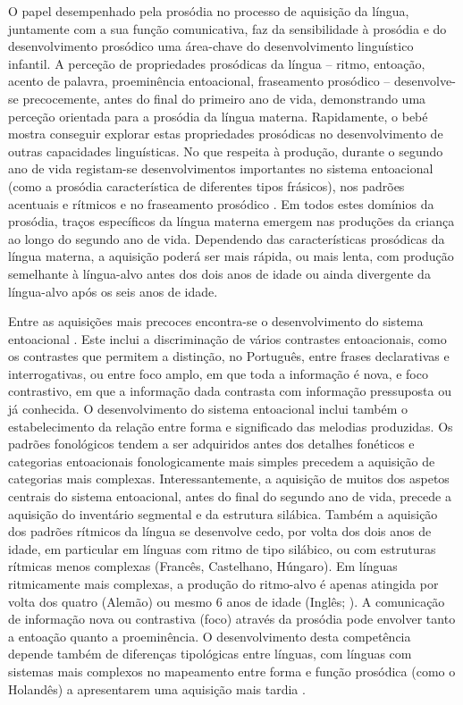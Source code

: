 \documentclass[output=paper,colorlinks,citecolor=brown,booklanguage=portuguese]{langscibook}
\begin{document}
O papel desempenhado pela prosódia no processo de aquisição da língua, juntamente com a sua função comunicativa, faz da sensibilidade à prosódia e do desenvolvimento prosódico uma área-chave do desenvolvimento linguístico infantil. A perceção de propriedades prosódicas da língua – ritmo, entoação, acento de palavra, proeminência entoacional, fraseamento prosódico –  desenvolve-se precocemente, antes do final do primeiro ano de vida, demonstrando uma perceção orientada para a prosódia da língua materna. Rapidamente, o bebé mostra conseguir explorar estas propriedades prosódicas no desenvolvimento de outras capacidades linguísticas. No que respeita à produção, durante o segundo ano de vida registam-se desenvolvimentos importantes no sistema entoacional (como a prosódia característica de diferentes tipos frásicos), nos padrões acentuais e rítmicos e no fraseamento prosódico \citep{Frota2016b, Frota2017, Carvalho2018, Frota2018, Post2018, Frota2020}. Em todos estes domínios da prosódia, traços específicos da língua materna emergem nas produções da criança ao longo do segundo ano de vida. Dependendo das características prosódicas da língua materna, a aquisição poderá ser mais rápida, ou mais lenta, com produção semelhante à língua-alvo antes dos dois anos de idade ou ainda divergente da língua-alvo após os seis anos de idade.

Entre as aquisições mais precoces encontra-se o desenvolvimento do sistema entoacional \citep{Frota2018}. Este inclui a discriminação de vários contrastes entoacionais, como os contrastes que permitem a distinção, no Português, entre frases declarativas e interrogativas, ou entre foco amplo, em que toda a informação é nova, e foco contrastivo, em que a informação dada contrasta com informação pressuposta ou já conhecida. O desenvolvimento do sistema entoacional inclui também o estabele\-cimento da relação entre forma e significado das melodias produzidas. Os padrões fonológicos tendem a ser adquiridos antes dos detalhes fonéticos e categorias entoacionais fonologicamente mais simples precedem a aquisição de categorias mais complexas. Interessantemente, a aquisição de muitos dos aspetos centrais do sistema entoacional, antes do final do segundo ano de vida, precede a aquisição do inventário segmental e da estrutura silábica. Também a aquisição dos padrões rítmicos da língua se desenvolve cedo, por volta dos dois anos de idade, em particular em línguas com ritmo de tipo silábico, ou com estruturas rítmicas menos complexas (Francês, Castelhano, Húngaro). Em línguas ritmicamente mais complexas, a produção do ritmo-alvo é apenas atingida por volta dos quatro (Alemão) ou mesmo 6 anos de idade (Inglês; \citealp{Post2018}). A comunicação de informação nova ou contrastiva (foco) através da prosódia pode envolver tanto a entoação quanto a proeminência. O desenvolvimento desta competência depende também de diferenças tipológicas entre línguas, com línguas com sistemas mais complexos no mapeamento entre forma e função prosódica (como o Holandês) a apresentarem uma aquisição mais tardia \citep{Chen2018}.
\end{document}

